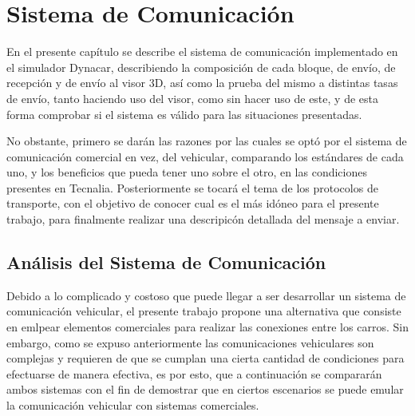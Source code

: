 \chapter{Sistema de Comunicación}\label{sec:capitulo5}
\thispagestyle{empty}

En el presente capítulo se describe el sistema de comunicación implementado en el simulador Dynacar, describiendo la composición de cada bloque, de envío, de recepción y de envío al visor 3D, así como la prueba del mismo a distintas tasas de envío, tanto haciendo uso del visor, como sin hacer uso de este, y de esta forma comprobar si el sistema es válido para las situaciones presentadas.\\

\par No obstante, primero se darán las razones por las cuales se optó por el sistema de comunicación comercial en vez, del vehicular, comparando los estándares de cada uno, y los beneficios que pueda tener uno sobre el otro, en las condiciones presentes en Tecnalia. Posteriormente se tocará el tema de los protocolos de transporte, con el objetivo de conocer cual es el más idóneo para el presente trabajo, para finalmente realizar una descripicón detallada del mensaje a enviar.  


\section{Análisis del Sistema de Comunicación}
Debido a lo complicado y costoso que puede llegar a ser desarrollar un sistema de comunicación vehicular, el presente trabajo propone una alternativa que consiste en emlpear elementos comerciales para realizar las conexiones entre los carros. Sin embargo, como se expuso anteriormente las comunicaciones vehiculares son complejas y requieren de que se cumplan una cierta cantidad de condiciones para efectuarse de manera efectiva, es por esto, que a continuación se compararán ambos sistemas con el fin de demostrar que en ciertos escenarios se puede emular la comunicación vehicular con sistemas comerciales.

